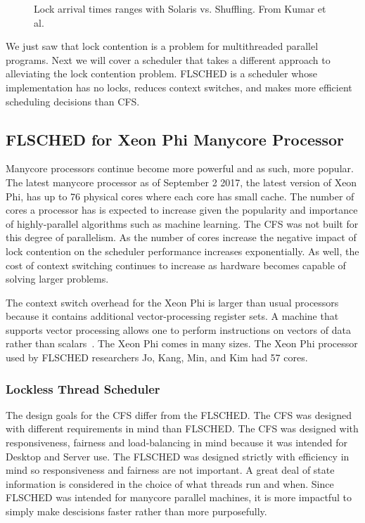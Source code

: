 \documentclass{sig-alternate}
\begin{document}
\begin{figure}
\centering
{}
\caption{Lock arrival times ranges with Solaris vs. Shuffling. From Kumar et al.~\cite{Kumar:2014}}
\label{fig:shuf_vs_solaris}
\end{figure}

We just saw that lock contention is a problem for multithreaded parallel programs. Next we will cover a scheduler that takes a different approach to alleviating the lock contention problem. FLSCHED is a scheduler whose implementation has no locks, reduces context switches, and makes more efficient scheduling decisions than CFS.~\cite{Jo:2017}

\subsection{FLSCHED for Xeon Phi Manycore Processor}
\label{sec:flsched}

Manycore processors continue become more powerful and as such, more popular. The latest manycore processor as of September 2 2017, the latest version of Xeon Phi, has up to 76 physical cores where each core has small cache. The number of cores a processor has is expected to increase given the popularity and importance of highly-parallel algorithms such as machine learning. The CFS was not built for this degree of parallelism. As the number of cores increase the negative impact of lock contention on the scheduler performance increases exponentially. As well, the cost of context switching continues to increase as hardware becomes capable of solving larger problems.

The context switch overhead for the Xeon Phi is larger than usual processors because it contains additional vector-processing register sets. \cite{Jo:2017} A machine that supports vector processing allows one to perform instructions on vectors of data rather than scalars~\cite{Mellon}. The Xeon Phi comes in many sizes. The Xeon Phi processor used by FLSCHED researchers Jo, Kang, Min, and Kim had 57 cores. ~\cite{Jo:2017}

\subsubsection{Lockless Thread Scheduler}
\label{sec:flsched_about}

The design goals for the CFS differ from the FLSCHED. The CFS was designed with different requirements in mind than FLSCHED. The CFS was designed with responsiveness, fairness and load-balancing in mind because it was intended for Desktop and Server use. The FLSCHED was designed strictly with efficiency in mind so responsiveness and fairness are not important. A great deal of state information is considered in the choice of what threads run and when. Since FLSCHED was intended for manycore parallel machines, it is more impactful to simply make descisions faster rather than more purposefully.~\cite{Jo:2017}
\end{document}
